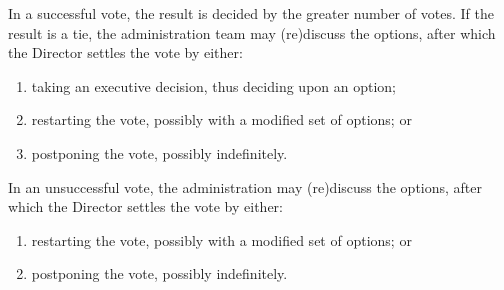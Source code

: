 \begin{enumerate}
    \begin{item}
        In a successful vote, the result is decided by the greater number of votes. If the result is a tie, the administration team may (re)discuss the options, after which the Director settles the vote by either:
        \begin{enumerate}
            \item taking an executive decision, thus deciding upon an option;
            \item restarting the vote, possibly with a modified set of options; or
            \item postponing the vote, possibly indefinitely.
        \end{enumerate}
    \end{item}

    \begin{item}
        In an unsuccessful vote, the administration may (re)discuss the options, after which the Director settles the vote by either:
        \begin{enumerate}
            \item restarting the vote, possibly with a modified set of options; or
            \item postponing the vote, possibly indefinitely.
        \end{enumerate}
    \end{item}

\end{enumerate}
\newpage
